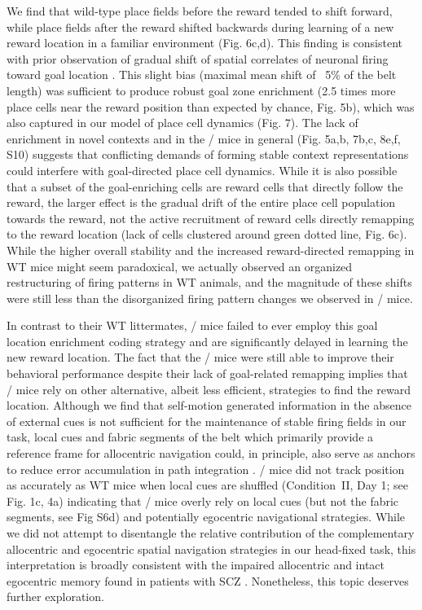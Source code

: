 We find that wild-type place fields before the reward tended to shift forward, while place fields after the reward shifted backwards during learning of a new reward location in a familiar environment (Fig. 6c,d). This finding is consistent with prior observation of gradual shift of spatial correlates of neuronal firing toward goal location \citep{Lee2006}. This slight bias (maximal mean shift of ~5$\%$ of the belt length) was sufficient to produce robust goal zone enrichment (2.5 times more place cells near the reward position than expected by chance, Fig. 5b), which was also captured in our model of place cell dynamics (Fig. 7). The lack of enrichment in novel contexts and in the \df/ mice in general (Fig. 5a,b, 7b,c, 8e,f, S10) suggests that conflicting demands of forming stable context representations could interfere with goal-directed place cell dynamics.  While it is also possible that a subset of the goal-enriching cells are reward cells that directly follow the reward, the larger effect is the gradual drift of the entire place cell population towards the reward, not the active recruitment of reward cells directly remapping to the reward location (lack of cells clustered around green dotted line, Fig. 6c). While the higher overall stability and the increased reward-directed remapping in WT mice might seem paradoxical, we actually observed an organized restructuring of firing patterns in WT animals, and the magnitude of these shifts were still less than the disorganized firing pattern changes we observed in \df/ mice.

In contrast to their WT littermates, \df/ mice failed to ever employ this goal location enrichment coding strategy and are significantly delayed in learning the new reward location. The fact that the \df/ mice were  still able to improve their behavioral performance despite their lack of goal-related remapping implies that \df/ mice rely on other alternative, albeit less efficient, strategies to find the reward location. Although we find that self-motion generated information in the absence of external cues is not sufficient for the maintenance of stable firing fields in our task, local cues and fabric segments of the belt which primarily provide a reference frame for allocentric navigation could, in principle, also serve as anchors to reduce error accumulation in path integration \citep{Etienne2004}\citep{Gothard1996}. \df/ mice did not track position as accurately as WT mice when local cues are shuffled (Condition~II, Day 1; see Fig. 1c, 4a) indicating that \df/ mice overly rely on local cues (but not the fabric segments, see Fig S6d) and potentially egocentric navigational strategies. While we did not attempt to disentangle the relative contribution of the complementary allocentric and egocentric spatial navigation strategies in our head-fixed task, this interpretation is broadly consistent with the impaired allocentric and intact egocentric memory found in patients with SCZ \citep{Agarwal2015}\citep{Weniger2008}.  Nonetheless, this topic deserves further exploration.

